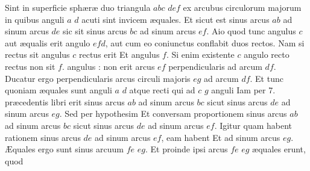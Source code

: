 \documentclass[11pt,a4paper]{article}
\begin{document}
Sint in superficie sphæræ duo triangula $abc$ $def$ ex arcubus circulorum majorum in quibus anguli $a$ $d$ acuti sint invicem æquales. Et sicut est sinus arcus $ab$ ad sinum arcus $de$ sic sit sinus arcus $bc$ ad sinum arcus $ef$. Aio quod tunc angulus $c$ aut æqualis erit angulo $efd$, aut cum eo coniunctus conflabit duos rectos. Nam si rectus sit angulus $c$ rectus erit Et angulus $f$. Si enim existente $c$ angulo recto rectus non sit $f$. angulus : non erit arcus $ef$ perpendicularis ad arcum $df$. Ducatur ergo perpendicularis arcus circuli majoris $eg$ ad arcum $df$. Et tunc quoniam æquales sunt anguli $a$ $d$ atque recti qui ad $c$ $g$ anguli Iam per 7.  præcedentis libri erit sinus arcus $ab$ ad sinum arcus $bc$ sicut sinus arcus $de$ ad sinum arcus $eg$. Sed per hypothesim Et conversam proportionem sinus arcus $ab$ ad sinum arcus $bc$ sicut sinus arcus $de$ ad sinum arcus $ef$. Igitur quam habent rationem sinus arcus $de$ ad sinum arcus $ef$, eam habent Et ad sinum arcus $eg$. Æquales ergo sunt sinus arcuum $fe$ $eg$. Et proinde ipsi arcus $fe$ $eg$ æquales erunt, quod
\end{document}

